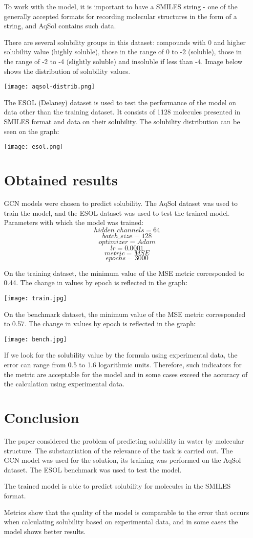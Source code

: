 \documentclass[a4paper,14pt]{article}
\begin{document}
To work with the model, it is important to have a SMILES string - one of the generally accepted formats for recording molecular structures in the form of a string, and AqSol contains such data.

There are several solubility groups in this dataset: compounds with 0 and higher solubility value (highly soluble), those in the range of 0 to -2 (soluble), those in the range of -2 to -4 (slightly soluble) and insoluble if less than -4. Image below shows the distribution of solubility values.

\texttt{[image: aqsol-distrib.png]}

The ESOL (Delaney) dataset is used to test the performance of the model on data other than the training dataset. It consists of 1128 molecules presented in SMILES format and data on their solubility. The solubility distribution can be seen on the graph:

\texttt{[image: esol.png]}

\section{Obtained results} 
GCN models were chosen to predict solubility. The AqSol dataset was used to train the model, and the ESOL dataset was used to test the trained model.
Parameters with which the model was trained:
$$hidden\_channels = 64$$
$$batch\_size = 128$$
$$optimizer = Adam$$
$$lr = 0.0001$$
$$metric = MSE$$
$$epochs = 3000$$

On the training dataset, the minimum value of the MSE metric corresponded to 0.44. The change in values by epoch is reflected in the graph:

\texttt{[image: train.jpg]}

On the benchmark dataset, the minimum value of the MSE metric corresponded to 0.57. The change in values by epoch is reflected in the graph:

\texttt{[image: bench.jpg]}

If we look for the solubility value by the formula using experimental data, the error can range from 0.5 to 1.6 logarithmic units. Therefore, such indicators for the metric are acceptable for the model and in some cases exceed the accuracy of the calculation using experimental data.

\section{Conclusion}
The paper considered the problem of predicting solubility in water by molecular structure. The substantiation of the relevance of the task is carried out. The GCN model was used for the solution, its training was performed on the AqSol dataset. The ESOL benchmark was used to test the model.

The trained model is able to predict solubility for molecules in the SMILES format.

Metrics show that the quality of the model is comparable to the error that occurs when calculating solubility based on experimental data, and in some cases the model shows better results.
\end{document}
